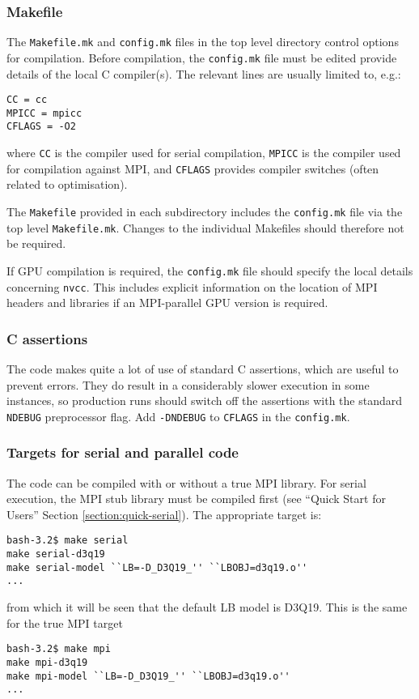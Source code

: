 \subsubsection{Makefile}

The \texttt{Makefile.mk} and \texttt{config.mk} files in the top level
directory control options for compilation. Before compilation,
the \texttt{config.mk} file must be edited provide details of the local
C compiler(s). The relevant lines are usually limited to, e.g.:
\begin{lstlisting}
CC = cc
MPICC = mpicc
CFLAGS = -O2
\end{lstlisting}
where \texttt{CC} is the compiler used for serial compilation,
\texttt{MPICC} is the compiler used for compilation against
MPI, and \texttt{CFLAGS} provides compiler switches (often
related to optimisation).

The \texttt{Makefile} provided in each subdirectory includes
the \texttt{config.mk} file via the top level \texttt{Makefile.mk}.
Changes to the individual Makefiles should therefore not be required.

If GPU compilation is required, the \texttt{config.mk} file should
specify the local details concerning \texttt{nvcc}. This includes
explicit information on the location of MPI headers and libraries
if an MPI-parallel GPU version is required.

\subsubsection{C assertions}

The code makes quite a lot of use of standard C assertions, which
are useful to prevent errors. They do result in a considerably
slower execution in some instances, so production runs should
switch off the assertions with the standard \texttt{NDEBUG}
preprocessor flag. Add \texttt{-DNDEBUG} to \texttt{CFLAGS} in
the \texttt{config.mk}.

\subsubsection{Targets for serial and parallel code}

The code can be compiled with or without a true MPI library.
For serial execution, the MPI stub library must be compiled
first (see ``Quick Start for Users'' Section \ref{section:quick-serial}).
The appropriate target is:
\begin{lstlisting}
bash-3.2$ make serial
make serial-d3q19
make serial-model ``LB=-D_D3Q19_'' ``LBOBJ=d3q19.o''
...
\end{lstlisting}
from which it will be seen that the default LB model is D3Q19. This is
the same for the true MPI target
\begin{lstlisting}
bash-3.2$ make mpi
make mpi-d3q19
make mpi-model ``LB=-D_D3Q19_'' ``LBOBJ=d3q19.o''
...
\end{lstlisting}

